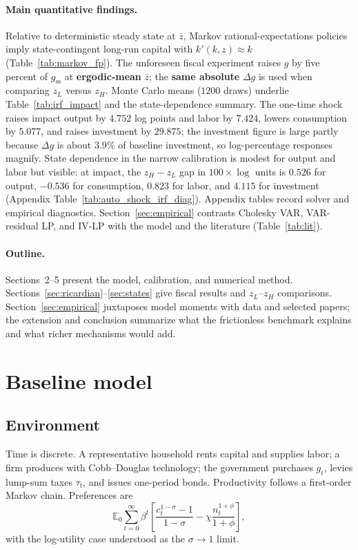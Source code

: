\documentclass[11pt,a4paper]{article}
\begin{document}
\paragraph{Main quantitative findings.}
Relative to deterministic steady state at $\bar z$, Markov rational-expectations policies imply state-contingent long-run capital with $k'(k,z)\approx k$ (Table~\ref{tab:markov_fp}). The unforeseen fiscal experiment raises $g$ by five percent of $g_{\mathrm{ss}}$ at \textbf{ergodic-mean} $\bar z$; the \textbf{same absolute} $\Delta g$ is used when comparing $z_L$ versus $z_H$. Monte Carlo means ($1200$ draws) underlie Table~\ref{tab:irf_impact} and the state-dependence summary. The one-time shock raises impact output by $4.752$ log points and labor by $7.424$, lowers consumption by $5.077$, and raises investment by $29.875$; the investment figure is large partly because $\Delta g$ is about $3.9\%$ of baseline investment, so log-percentage responses magnify. State dependence in the narrow calibration is modest for output and labor but visible: at impact, the $z_H-z_L$ gap in $100\times\log$ units is $0.526$ for output, $-0.536$ for consumption, $0.823$ for labor, and $4.115$ for investment (Appendix Table~\ref{tab:auto_shock_irf_diag}). Appendix tables record solver and empirical diagnostics. Section~\ref{sec:empirical} contrasts Cholesky VAR, VAR-residual LP, and IV-LP with the model and the literature (Table~\ref{tab:lit}).

\paragraph{Outline.}
Sections~2--5 present the model, calibration, and numerical method. Sections~\ref{sec:ricardian}--\ref{sec:states} give fiscal results and $z_L$--$z_H$ comparisons. Section~\ref{sec:empirical} juxtaposes model moments with data and selected papers; the extension and conclusion summarize what the frictionless benchmark explains and what richer mechanisms would add.

\section{Baseline model}

\subsection{Environment}
Time is discrete. A representative household rents capital and supplies labor; a firm produces with Cobb--Douglas technology; the government purchases $g_t$, levies lump-sum taxes $\tau_t$, and issues one-period bonds. Productivity follows a first-order Markov chain. Preferences are
\begin{equation}
  \mathbb{E}_0\sum_{t=0}^{\infty}\beta^t
  \left[
    \frac{c_t^{1-\sigma}-1}{1-\sigma}
    -
    \chi\frac{n_t^{1+\phi}}{1+\phi}
  \right],
\end{equation}
with the log-utility case understood as the $\sigma\to1$ limit.
\end{document}
